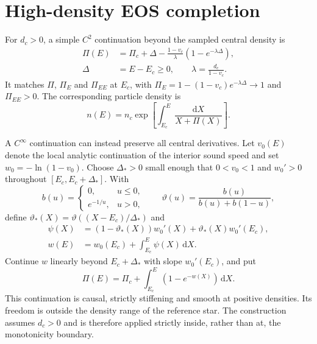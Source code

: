 \documentclass[aps,prd,reprint,a4paper,nofootinbib,floatfix]{revtex4-2}
\newcommand{\dd}{\mathrm d}
\begin{document}
\section{High-density EOS completion}
\label{app:completion}
For $d_c>0$, a simple $C^2$ continuation beyond the sampled central density is
\begin{align}
 \Pi(E)&=\Pi_c+\Delta-\frac{1-v_c}{\lambda}
                    (1-e^{-\lambda\Delta}),\nonumber\\
 \Delta&=E-E_c\ge0,\qquad \lambda=\frac{d_c}{1-v_c}.
 \label{eq:completion}
\end{align}
It matches $\Pi$, $\Pi_E$ and $\Pi_{EE}$ at $E_c$, with
$\Pi_E=1-(1-v_c)e^{-\lambda\Delta}\to1$ and $\Pi_{EE}>0$.
The corresponding particle density is
\begin{equation}
 n(E)=n_c\exp\left[\int_{E_c}^{E}\frac{\dd X}{X+\Pi(X)}\right].
\end{equation}

A $C^\infty$ continuation can instead preserve all central derivatives. Let $v_0(E)$ denote the local analytic continuation of the interior sound speed and set $w_0=-\ln(1-v_0)$. Choose $\Delta_*>0$ small enough that $0<v_0<1$ and $w_0'>0$ throughout $[E_c,E_c+\Delta_*]$. With
\begin{equation}
 b(u)=\begin{cases}0,&u\le0,\\e^{-1/u},&u>0,\end{cases}
 \qquad \vartheta(u)=\frac{b(u)}{b(u)+b(1-u)},
\end{equation}
define $\vartheta_* (X)=\vartheta((X-E_c)/\Delta_*)$ and
\begin{align}
 \psi(X)&=(1-\vartheta_*(X))w_0'(X)
       +\vartheta_*(X)w_0'(E_c),\nonumber\\
 w(E)&=w_0(E_c)+\int_{E_c}^E\psi(X)\,\dd X.
\end{align}
Continue $w$ linearly beyond $E_c+\Delta_*$ with slope $w_0'(E_c)$, and put
\begin{equation}
 \Pi(E)=\Pi_c+\int_{E_c}^E(1-e^{-w(X)})\,\dd X.
\end{equation}
This continuation is causal, strictly stiffening and smooth at positive densities. Its freedom is outside the density range of the reference star. The construction assumes $d_c>0$ and is therefore applied strictly inside, rather than at, the monotonicity boundary.
\end{document}
